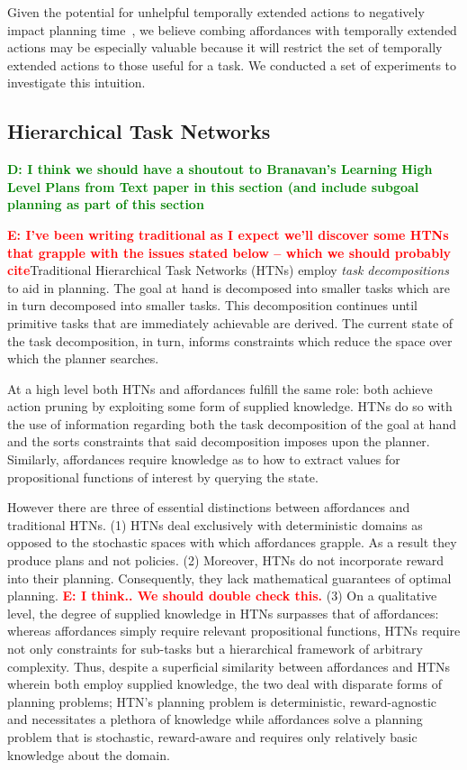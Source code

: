 \documentclass[conference]{IEEEtran}
\newcommand{\dnote}[1]{\textcolor{Green}{\textbf{D: #1}}}
\newcommand{\enote}[1]{\textcolor{Red}{\textbf{E: #1}}}
\begin{document}
Given the potential for unhelpful temporally extended actions to negatively impact planning time~\cite{Jong:2008zr}, we believe combing affordances with temporally extended actions
may be especially valuable because it will restrict the set of temporally extended actions to those
useful for a task. We conducted a set of experiments to investigate this intuition.

\subsection{Hierarchical Task Networks}

\dnote{I think we should have a shoutout to Branavan's Learning High Level Plans from Text paper in this section (and include subgoal planning as part of this section}

\enote{I've been writing traditional as I expect we'll discover some HTNs that grapple with the issues stated below -- which we should probably cite}Traditional Hierarchical Task Networks (HTNs) employ \textit{task decompositions} to aid in planning. The goal at hand is decomposed into smaller tasks which are in turn decomposed into smaller tasks. This decomposition continues until primitive tasks that are immediately achievable are derived. The current state of the task decomposition, in turn, informs constraints which reduce the space over which the planner searches.

At a high level both HTNs and affordances fulfill the same role: both achieve action pruning by exploiting some form of supplied knowledge. HTNs do so with the use of information regarding both the task decomposition of the goal at hand and the sorts constraints that said decomposition imposes upon the planner. Similarly, affordances require knowledge as to how to extract values for propositional functions of interest by querying the state.

However there are three of essential distinctions between affordances and traditional HTNs. (1) HTNs deal exclusively with deterministic domains as opposed to the stochastic spaces with which affordances grapple. As a result they produce plans and not policies. (2) Moreover, HTNs do not incorporate reward into their planning. Consequently, they lack mathematical guarantees of optimal planning. \enote{I think.. We should double check this.} (3) On a qualitative level, the degree of supplied knowledge in HTNs surpasses that of affordances: whereas affordances simply require relevant propositional functions, HTNs require not only constraints for sub-tasks but a hierarchical framework of arbitrary complexity. Thus, despite a superficial similarity between affordances and HTNs wherein both employ supplied knowledge, the two deal with disparate forms of planning problems; HTN's planning problem is deterministic, reward-agnostic and necessitates a plethora of knowledge while affordances solve a planning problem that is stochastic, reward-aware and requires only relatively basic knowledge about the domain.
\end{document}
